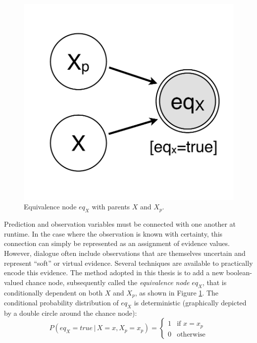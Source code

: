 \begin{figure}
\vspace{-2mm}
\centering
\includegraphics[scale=0.25]{imgs/prediction.pdf} 
\vspace{-2mm}
\caption{Equivalence node $eq_{X}$ with parents $X$ and $X_p$.}
\label{fig:prediction}
\end{figure}

Prediction and observation variables must be connected with one another at runtime.  In the case where the observation is known with certainty, this connection can simply be represented as an assignment of evidence values.  However, dialogue often include observations that are themselves uncertain and represent ``soft'' or virtual evidence.  Several techniques are available to practically encode this evidence. The method adopted in this thesis is to add a new boolean-valued chance node, subsequently called the \textit{equivalence node} $eq_{X}$, that is conditionally dependent on both $X$ and $X_p$, as shown in Figure \ref{fig:prediction}. The conditional probability distribution of $eq_X$ is deterministic (graphically depicted by a double circle around the chance node): 
\begin{equation}
P(eq_{X}\!=\!true \, | \, X\!=\!x, X_p\!=\!x_p) = \begin{cases}
1 & \text{if } x = x_p \\
0 & \text{otherwise}
\end{cases} \label{eq:equivdistrib}
\end{equation}

